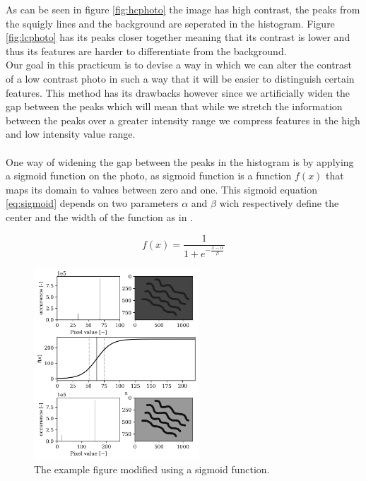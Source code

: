 As can be seen in figure \ref{fig:hcphoto} the image has high contrast, the peaks from the squigly lines and the background are seperated in the histogram. Figure \ref{fig:lcphoto} has its peaks closer together meaning that its contrast is lower and thus its features are harder to differentiate from the background.\\
Our goal in this practicum is to devise a way in which we can alter the contrast of a low contrast photo in such a way that it will be easier to distinguish certain features. This method has its drawbacks however since we artificially widen the gap between the peaks which will mean that while we stretch the information between the peaks over a greater intensity range we compress features in the high and low intensity value range.\\
\\
One way of widening the gap between the peaks in the histogram is by applying a sigmoid function on the photo, as sigmoid function is a function $f(x)$ that maps its domain to values between zero and one. This sigmoid equation \ref{eq:sigmoid} depends on two parameters $\alpha$ and $\beta$ wich respectively define the center and the width of the function as in \cite{article_sigmoid}.

\begin{equation}
    f(x) = \frac{1}{1+e^{-\frac{x-\alpha}{\beta}}}
    \label{eq:sigmoid}
\end{equation}
\newpage
\begin{figure}
    \centering
    \includegraphics[width=0.55\textwidth,keepaspectratio]{afbeeldingen/sigmoid_explained.png}
    \caption{The example figure modified using a sigmoid function.}
    \label{fig:sigmoid}
\end{figure}

